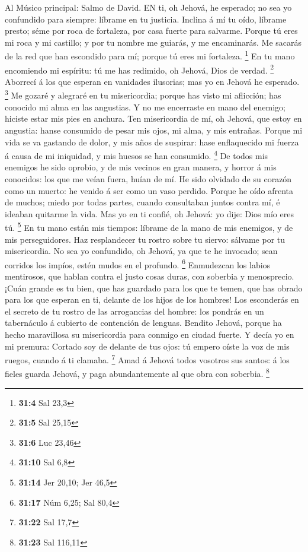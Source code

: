  Al Músico principal: Salmo de David. EN ti, oh Jehová, he
esperado; no sea yo confundido para siempre: líbrame en tu justicia.
 Inclina á mí tu oído, líbrame presto; séme por roca de
fortaleza, por casa fuerte para salvarme.  Porque tú eres mi
roca y mi castillo; y por tu nombre me guiarás, y me encaminarás.
 Me sacarás de la red que han escondido para mí; porque tú
eres mi fortaleza. \footnote{\textbf{31:4} Sal 23,3}  En tu
mano encomiendo mi espíritu: tú me has redimido, oh Jehová, Dios de
verdad. \footnote{\textbf{31:5} Sal 25,15}  Aborrecí á los
que esperan en vanidades ilusorias; mas yo en Jehová he esperado.
\footnote{\textbf{31:6} Luc 23,46}  Me gozaré y alegraré en
tu misericordia; porque has visto mi aflicción; has conocido mi alma en
las angustias.  Y no me encerraste en mano del enemigo;
hiciste estar mis pies en anchura.  Ten misericordia de mí,
oh Jehová, que estoy en angustia: hanse consumido de pesar mis ojos, mi
alma, y mis entrañas.  Porque mi vida se va gastando de
dolor, y mis años de suspirar: hase enflaquecido mi fuerza á causa de mi
iniquidad, y mis huesos se han consumido. \footnote{\textbf{31:10} Sal
  6,8}  De todos mis enemigos he sido oprobio, y de mis
vecinos en gran manera, y horror á mis conocidos: los que me veían
fuera, huían de mí.  He sido olvidado de su corazón como un
muerto: he venido á ser como un vaso perdido.  Porque he
oído afrenta de muchos; miedo por todas partes, cuando consultaban
juntos contra mí, é ideaban quitarme la vida.  Mas yo en ti
confié, oh Jehová: yo dije: Dios mío eres tú. \footnote{\textbf{31:14}
  Jer 20,10; Jer 46,5}  En tu mano están mis tiempos:
líbrame de la mano de mis enemigos, y de mis perseguidores.
 Haz resplandecer tu rostro sobre tu siervo: sálvame por tu
misericordia.  No sea yo confundido, oh Jehová, ya que te
he invocado; sean corridos los impíos, estén mudos en el profundo.
\footnote{\textbf{31:17} Núm 6,25; Sal 80,4}  Enmudezcan
los labios mentirosos, que hablan contra el justo cosas duras, con
soberbia y menosprecio.  ¡Cuán grande es tu bien, que has
guardado para los que te temen, que has obrado para los que esperan en
ti, delante de los hijos de los hombres!  Los esconderás en
el secreto de tu rostro de las arrogancias del hombre: los pondrás en un
tabernáculo á cubierto de contención de lenguas.  Bendito
Jehová, porque ha hecho maravillosa su misericordia para conmigo en
ciudad fuerte.  Y decía yo en mi premura: Cortado soy de
delante de tus ojos: tú empero oíste la voz de mis ruegos, cuando á ti
clamaba. \footnote{\textbf{31:22} Sal 17,7}  Amad á Jehová
todos vosotros sus santos: á los fieles guarda Jehová, y paga
abundantemente al que obra con soberbia. \footnote{\textbf{31:23} Sal
  116,11}

